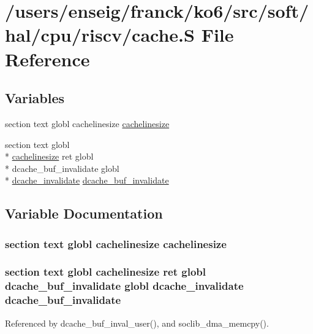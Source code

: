 \hypertarget{riscv_2cache_8S}{\section{/users/enseig/franck/ko6/src/soft/hal/cpu/riscv/cache.S File Reference}
\label{riscv_2cache_8S}
}
\subsection*{Variables}
\begin{DoxyCompactItemize}
\item 
section text globl cachelinesize \hyperlink{riscv_2cache_8S_a2ffad5962fec472ce41e46451bcd8f02}{cachelinesize}
\item 
section text globl \\*
\hyperlink{libc_8h_a7737fc4bdea8d6ab04f67ef74c3f1b9d}{cachelinesize} ret globl \\*
dcache\-\_\-buf\-\_\-invalidate globl \\*
\hyperlink{cache_8h_ae63d2b64eeb0e4e0ab3f691b3cf26b76}{dcache\-\_\-invalidate} \hyperlink{riscv_2cache_8S_a55e097eac5768a878728c55450b75595}{dcache\-\_\-buf\-\_\-invalidate}
\end{DoxyCompactItemize}


\subsection{Variable Documentation}
\hypertarget{riscv_2cache_8S_a2ffad5962fec472ce41e46451bcd8f02}{
\subsubsection[{cachelinesize}]{\setlength{\rightskip}{0pt plus 5cm}section text globl cachelinesize cachelinesize}}\label{riscv_2cache_8S_a2ffad5962fec472ce41e46451bcd8f02}
\hypertarget{riscv_2cache_8S_a55e097eac5768a878728c55450b75595}{
\subsubsection[{dcache\-\_\-buf\-\_\-invalidate}]{\setlength{\rightskip}{0pt plus 5cm}section text globl {\bf cachelinesize} ret globl dcache\-\_\-buf\-\_\-invalidate globl {\bf dcache\-\_\-invalidate} dcache\-\_\-buf\-\_\-invalidate}}\label{riscv_2cache_8S_a55e097eac5768a878728c55450b75595}


Referenced by dcache\-\_\-buf\-\_\-inval\-\_\-user(), and soclib\-\_\-dma\-\_\-memcpy().

